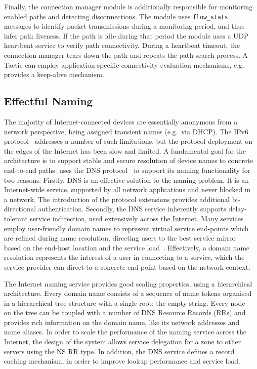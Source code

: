 Finally, the connection manager  module is additionally responsible for monitoring
enabled paths and detecting disconnections. The module uses \texttt{flow\_stats}
\of messages to identify packet transmissions during a monitoring period, and
thus infer path liveness. If the path is idle during that period the
module uses a UDP heartbeat service to verify path connectivity. During a
heartbeat timeout, the connection manager tears down the path and repeats the
path search  process.  A Tactic can employ application-specific
connectivity evaluation mechanisms, e.g. \openvpn provides a keep-alive mechanism.

\subsection{Effectful Naming} \label{signpost-naming}

The majority of Internet-connected devices are essentially anonymous from a
network perspective, being assigned transient names (e.g.~via DHCP). The IPv6
protocol~ addresses a number of such limitations, but the protocol
deployment on the edges of the Internet has been slow and limited. A fundamental
goal for the \signpost architecture is to support stable and secure resolution
of device  names to concrete end-to-end paths.  \signpost uses the DNS
protocol~ to support its naming functionality for two reasons.
Firstly, DNS is an effective solution to the naming problem. It is an
Internet-wide service, supported by all network applications and never blocked
in a network. The introduction of the \dnssec protocol extensions provides
additional bi-directional authentication.  Secondly, the DNS service inherently 
supports delay-tolerant service indirection, used extensively across the
Internet.  Many services employ user-friendly domain names to represent virtual
service end-points which are refined during name resolution, directing users to
the best service mirror based on the end-host location and the service
load~. Effectively, a domain name resolution represents the
interest of a user in connecting to a service, which the service provider can
direct to a concrete end-point based on the network context.  

The Internet naming service provides good scaling properties, using a
hierarchical architecture. Every domain name consists of a sequence of name
tokens organised in a hierarchical tree structure with a single root: the empty
string. Every node on the tree can be coupled with a number of DNS Resource
Records (RRs) and provides rich information on the domain name, like its network
addresses and name aliases. In order to scale the performance of the naming
service across the Internet, the design of the system allows service delegation
for a zone to other servers using the NS RR type.  In addition, the DNS
service defines a record caching mechanism, in order to improve lookup performance and
service load. 

